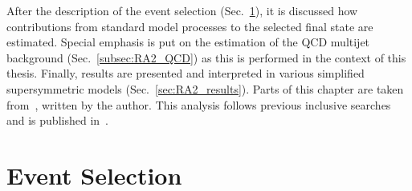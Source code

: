 After the description of the event selection (Sec.~\ref{sec:RA2_sel}), it is discussed how contributions from standard model processes to the selected final state are estimated. Special emphasis is put on the estimation of the QCD multijet background (Sec.~\ref{subsec:RA2_QCD}) as this is performed in the context of this thesis. Finally, results are presented and interpreted in various simplified supersymmetric models (Sec.~\ref{sec:RA2_results}). Parts of this chapter are taken from~\cite{bib:AN-12-350}, written by the author. This analysis follows previous inclusive searches~\cite{springerlink:10.1007/JHEP08(2011)155, Chatrchyan:2012lia} and is published in~\cite{Chatrchyan:2014lfa}.
    
\section{Event Selection}
\label{sec:RA2_sel}
